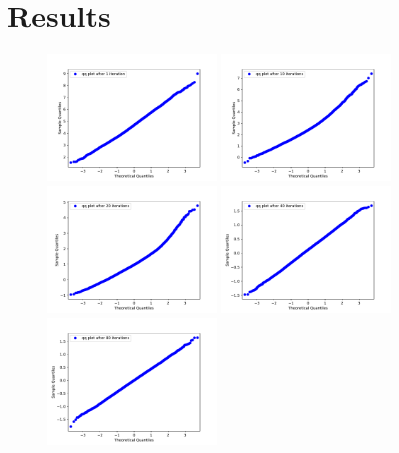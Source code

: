 \documentclass{article}
\begin{document}
	\section{Results}
	\begin{figure}[htbp]
		\centering
		\includegraphics[width=0.4\textwidth]{../imgs/harmonic_oscillator_track/track_10010000_qq_1.pdf}
		\includegraphics[width=0.4\textwidth]{../imgs/harmonic_oscillator_track/track_10010000_qq_10.pdf}
		\\
		\includegraphics[width=0.4\textwidth]{../imgs/harmonic_oscillator_track/track_10010000_qq_20.pdf}
		\includegraphics[width=0.4\textwidth]{../imgs/harmonic_oscillator_track/track_10010000_qq_40.pdf}
		\\
		\includegraphics[width=0.4\textwidth]{../imgs/harmonic_oscillator_track/track_10010000_qq_80.pdf}

\end{figure}
\end{document}
